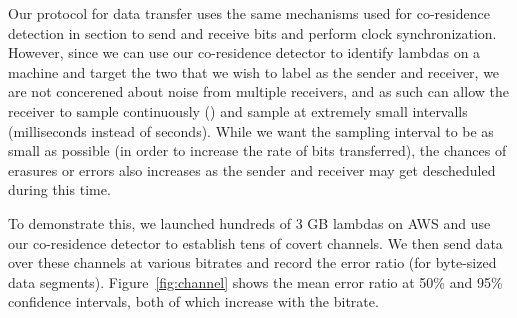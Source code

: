 Our protocol for data transfer uses the same mechanisms used for co-residence
detection in section  to send and receive bits and perform clock
synchronization. However, since we can use our co-residence detector to identify
lambdas on a machine and target the two that we wish to label as the sender and
receiver, we are not concerened about noise from multiple receivers, and as such
can allow the receiver to sample continuously () and sample at
extremely small intervalls (milliseconds instead of seconds). While we want the
sampling interval to be as small as possible (in order to increase the rate of
bits transferred), the chances of erasures or errors also increases as the
sender and receiver may get descheduled during this time. 

To demonstrate this, we launched hundreds of 3 GB lambdas on AWS and use our
co-residence detector to establish tens of covert channels. We then send data
over these channels at various bitrates and record the error ratio (for
byte-sized data segments). Figure~\ref{fig:channel} shows the mean error ratio
at 50\% and 95\% confidence intervals, both of which increase with the bitrate.


